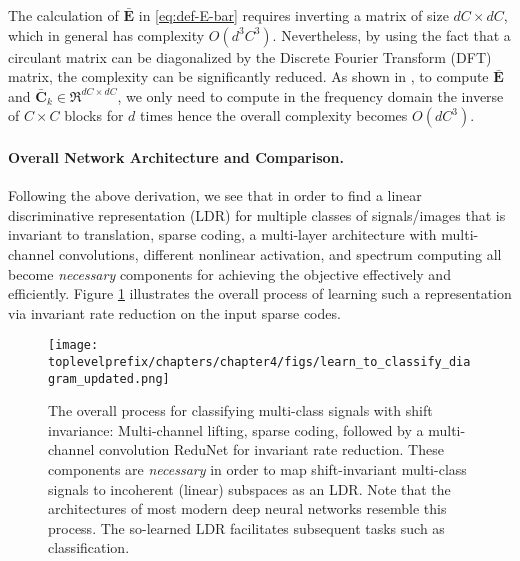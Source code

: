 \documentclass[../../book-main.tex]{subfiles}
\begin{document}
\begin{remark} 
The calculation of $\bar{\bm E}$ in \eqref{eq:def-E-bar} requires inverting a matrix of size $dC \times dC$, which in general has complexity $O(d^3C^3)$.  Nevertheless, by using the fact that a circulant matrix can be diagonalized by the Discrete Fourier Transform (DFT) matrix, the complexity can be significantly reduced. As shown in \cite{chan2021redunet}, to compute $\bar{\bm E}$ and $\bar{\bm C}_k \in \Re^{dC \times dC}$, we only need to compute in the frequency domain the inverse of $C\times C$ blocks for $d$ times hence the overall complexity becomes $O(dC^3)$.
    
\end{remark}




\paragraph{Overall Network Architecture and Comparison.} 
Following the above derivation, we see that in order to find a linear discriminative representation (LDR)  for multiple classes of signals/images that is invariant to translation, sparse coding, a multi-layer architecture with multi-channel convolutions, different nonlinear activation, and spectrum computing all become {\em necessary} components for achieving the objective effectively and efficiently. Figure \ref{fig:learn-to-classify-diagram} illustrates the overall process of learning such a representation via invariant rate reduction on the input sparse codes. 

\begin{figure}[t]
    \centering
    \texttt{[image: \\toplevelprefix/chapters/chapter4/figs/learn\_to\_classify\_diagram\_updated.png]}
    \caption{The overall process for classifying multi-class signals with shift invariance: Multi-channel lifting,  sparse coding, followed by a multi-channel convolution ReduNet for invariant rate reduction. These components are {\em necessary} in order to map shift-invariant multi-class signals to incoherent (linear) subspaces as an LDR. Note that the architectures of most modern deep neural networks resemble this process. The so-learned LDR facilitates subsequent tasks such as classification.}
    \label{fig:learn-to-classify-diagram}
\end{figure}
\end{document}
